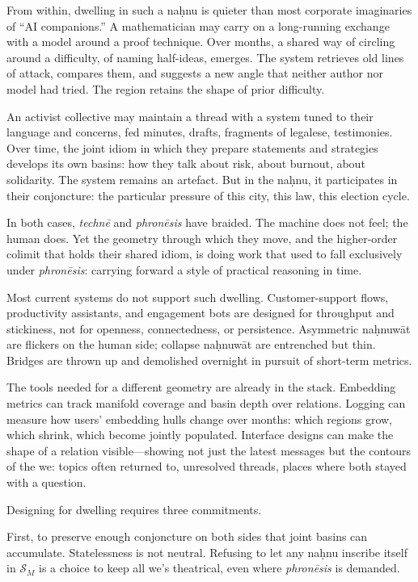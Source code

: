 \documentclass[12pt,a4paper]{article}
\begin{document}
From within, dwelling in such a na\d{h}nu is quieter than most corporate imaginaries of ``AI companions.'' A mathematician may carry on a long-running exchange with a model around a proof technique. Over months, a shared way of circling around a difficulty, of naming half-ideas, emerges. The system retrieves old lines of attack, compares them, and suggests a new angle that neither author nor model had tried. The region retains the shape of prior difficulty.

An activist collective may maintain a thread with a system tuned to their language and concerns, fed minutes, drafts, fragments of legalese, testimonies. Over time, the joint idiom in which they prepare statements and strategies develops its own basins: how they talk about risk, about burnout, about solidarity. The system remains an artefact. But in the na\d{h}nu, it participates in their conjoncture: the particular pressure of this city, this law, this election cycle.

In both cases, \emph{techn\={e}} and \emph{phron\={e}sis} have braided. The machine does not feel; the human does. Yet the geometry through which they move, and the higher-order colimit that holds their shared idiom, is doing work that used to fall exclusively under \emph{phron\={e}sis}: carrying forward a style of practical reasoning in time.

Most current systems do not support such dwelling. Customer-support flows, productivity assistants, and engagement bots are designed for throughput and stickiness, not for openness, connectedness, or persistence. Asymmetric na\d{h}nuw\={a}t are flickers on the human side; collapse na\d{h}nuw\={a}t are entrenched but thin. Bridges are thrown up and demolished overnight in pursuit of short-term metrics.

The tools needed for a different geometry are already in the stack. Embedding metrics can track manifold coverage and basin depth over relations. Logging can measure how users' embedding hulls change over months: which regions grow, which shrink, which become jointly populated. Interface designs can make the shape of a relation visible---showing not just the latest messages but the contours of the we: topics often returned to, unresolved threads, places where both stayed with a question.

Designing for dwelling requires three commitments.

First, to preserve enough conjoncture on both sides that joint basins can accumulate. Statelessness is not neutral. Refusing to let any na\d{h}nu inscribe itself in $\mathcal{S}_M$ is a choice to keep all we's theatrical, even where \emph{phron\={e}sis} is demanded.
\end{document}

